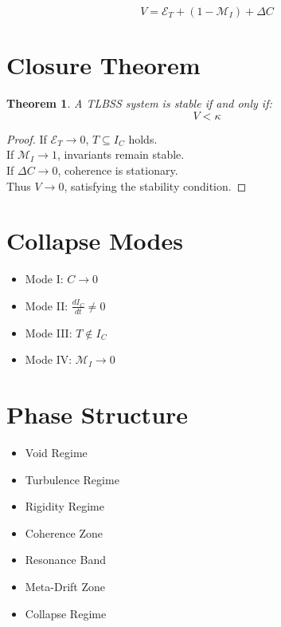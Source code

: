 \documentclass[conference]{IEEEtran}
\newtheorem{theorem}{Theorem}
\begin{document}
\begin{equation}
V = \mathcal{E}_T + (1 - \mathcal{M}_I) + \Delta C
\end{equation}

\section{Closure Theorem}

\begin{theorem}
A TLBSS system is stable if and only if:
\begin{equation}
V < \kappa
\end{equation}
\end{theorem}

\begin{proof}
If $\mathcal{E}_T \rightarrow 0$, $T \subseteq I_C$ holds.  \\
If $\mathcal{M}_I \rightarrow 1$, invariants remain stable.  \\
If $\Delta C \rightarrow 0$, coherence is stationary.  \\
Thus $V \rightarrow 0$, satisfying the stability condition.
\end{proof}

\section{Collapse Modes}

\begin{itemize}
\item Mode I: $C \rightarrow 0$
\item Mode II: $\frac{dI_C}{dt} \neq 0$
\item Mode III: $T \notin I_C$
\item Mode IV: $\mathcal{M}_I \rightarrow 0$
\end{itemize}

\section{Phase Structure}

\begin{itemize}
\item Void Regime
\item Turbulence Regime
\item Rigidity Regime
\item Coherence Zone
\item Resonance Band
\item Meta-Drift Zone
\item Collapse Regime
\end{itemize}
\end{document}
